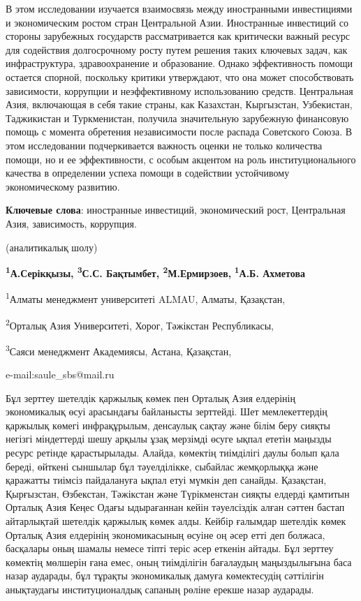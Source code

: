 В этом исследовании изучается взаимосвязь между иностранными
инвестициями и экономическим ростом стран Центральной Азии. Иностранные
инвестиций со стороны зарубежных государств рассматривается как
критически важный ресурс для содействия долгосрочному росту путем
решения таких ключевых задач, как инфраструктура, здравоохранение и
образование. Однако эффективность помощи остается спорной, поскольку
критики утверждают, что она может способствовать зависимости, коррупции
и неэффективному использованию средств. Центральная Азия, включающая в
себя такие страны, как Казахстан, Кыргызстан, Узбекистан, Таджикистан и
Туркменистан, получила значительную зарубежную финансовую помощь с
момента обретения независимости после распада Советского Союза. В этом
исследовании подчеркивается важность оценки не только количества помощи,
но и ее эффективности, с особым акцентом на роль институционального
качества в определении успеха помощи в содействии устойчивому
экономическому развитию.

{\bfseries Ключевые слова}: иностранные инвестиций, экономический рост,
Центральная Азия, зависимость, коррупция.


\begin{center}
(аналитикалық шолу)

{\bfseries \textsuperscript{1}А.Серікқызы, \textsuperscript{3}С.С.
Бақтымбет\envelope, \textsuperscript{2}М.Ермирзоев,}
{\bfseries \textsuperscript{1}А.Б. Ахметова}

\textsuperscript{1}Алматы менеджмент университеті ALMAU, Алматы,
Қазақстан,

\textsuperscript{2}Орталық Азия Университеті, Хорог, Тәжікстан
Республикасы,

\textsuperscript{3}Саяси менеджмент Академиясы, Астана, Қазақстан,

e-mail:saule\_sbs@mail.ru
\end{center}

Бұл зерттеу шетелдік қаржылық көмек пен Орталық Азия елдерінің
экономикалық өсуі арасындағы байланысты зерттейді. Шет мемлекеттердің
қаржылық көмегі инфрақұрылым, денсаулық сақтау және білім беру сияқты
негізгі міндеттерді шешу арқылы ұзақ мерзімді өсуге ықпал ететін маңызды
ресурс ретінде қарастырылады. Алайда, көмектің тиімділігі даулы болып
қала береді, өйткені сыншылар бұл тәуелділікке, сыбайлас жемқорлыққа
және қаражатты тиімсіз пайдалануға ықпал етуі мүмкін деп санайды.
Қазақстан, Қырғызстан, Өзбекстан, Тәжікстан және Түрікменстан сияқты
елдерді қамтитын Орталық Азия Кеңес Одағы ыдырағаннан кейін тәуелсіздік
алған сәттен бастап айтарлықтай шетелдік қаржылық көмек алды. Кейбір
ғалымдар шетелдік көмек Орталық Азия елдерінің экономикасының өсуіне оң
әсер етті деп болжаса, басқалары оның шамалы немесе тіпті теріс әсер
еткенін айтады. Бұл зерттеу көмектің мөлшерін ғана емес, оның
тиімділігін бағалаудың маңыздылығына баса назар аударады, бұл тұрақты
экономикалық дамуға көмектесудің сәттілігін анықтаудағы институционалдық
сапаның рөліне ерекше назар аударады.

